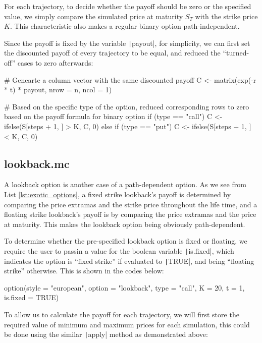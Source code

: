 For each trajectory, to decide whether the payoff should be zero or the specified value, we simply compare the simulated price at maturity $S_T$ with the strike price $K$. This characteristic also makes a regular binary option path-independent.

Since the payoff is fixed by the variable \texttt|payout|, for simplicity, we can first set the discounted payoff of every trajectory to be equal, and reduced the ``turned-off'' cases to zero afterwards:

\begin{Rminted}
# Genearte a column vector with the same discounted payoff
C <- matrix(exp(-r * t) * payout, nrow = n, ncol = 1)

# Based on the specific type of the option, reduced corresponding rows to zero based on the payoff formula for binary option
if (type == "call") {
    C <- ifelse(S[steps + 1, ] > K, C, 0)
} else if (type == "put") {
    C <- ifelse(S[steps + 1, ] < K, C, 0)
}
\end{Rminted}

\subsection{lookback.mc}

A lookback option is another case of a path-dependent option. As we see from List \ref{lst:exotic_options}, a fixed strike lookback's payoff is determined by comparing the price extramas and the strike price throughout the life time, and a floating strike lookback's payoff is by comparing the price extramas and the price at maturity. This makes the lookback option being obviously path-dependent.

To determine whether the pre-specified lookback option is fixed or floating, we require the user to passin a value for the boolean variable \texttt|is.fixed|, which indicates the option is ``fixed strike'' if evaluated to \texttt|TRUE|, and being ``floating strike'' otherwise. This is shown in the codes below:

\begin{Rminted}
option(style = "european", option = "lookback", type = "call", K = 20, t = 1, is.fixed = TRUE)
\end{Rminted}

To allow us to calculate the payoff for each trajectory, we will first store the required value of minimum and maximum prices for each simulation, this could be done using the similar \texttt|apply| method as demonstrated above:

